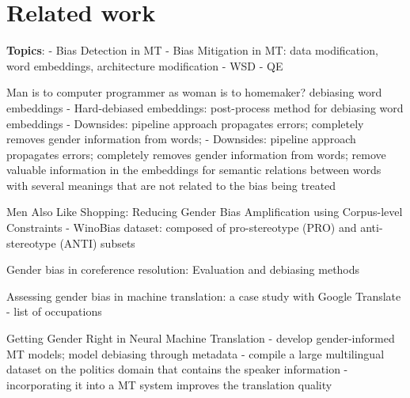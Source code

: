 \chapter{Related work}
\label{ch:Related_work}






\textbf{Topics}: 
- Bias Detection in MT
- Bias Mitigation in MT: data modification, word embeddings, architecture modification
- WSD %
- QE %


Man is to computer programmer as woman is to
homemaker? debiasing word embeddings \parencite{bolukbasi2016man}
- Hard-debiased embeddings: post-process method for debiasing word embeddings
- Downsides: pipeline approach propagates errors; completely removes gender information from words; 
- Downsides: pipeline approach propagates errors; completely removes gender information from words;  remove valuable information in the embeddings for semantic relations between words with several meanings that are not related to the bias being treated

Men Also Like Shopping: Reducing Gender Bias Amplification using Corpus-level Constraints \parencite{Zhao_2017}
- WinoBias dataset: composed of pro-stereotype (PRO) and anti-stereotype (ANTI) subsets

Gender bias in coreference resolution: Evaluation and debiasing
methods \parencite{Zhao_2018_coreference}

Assessing gender bias in machine translation: a case study with Google Translate \parencite{Prates_2019}
- list of occupations

Getting Gender Right in Neural Machine Translation \parencite{Vanmassenhove_2018}
- develop gender-informed MT models; model debiasing through metadata
- compile a large multilingual dataset on the politics domain that contains the speaker information
- incorporating it into a MT system improves the translation quality


